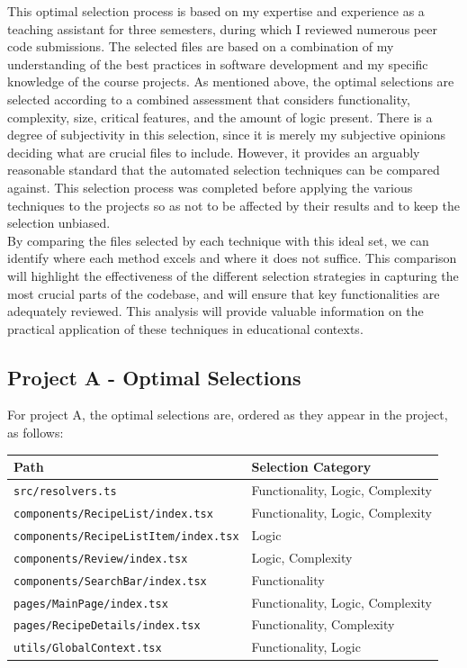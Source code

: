 This optimal selection process is based on my expertise and experience as a teaching assistant for three semesters, during which I reviewed numerous peer code submissions. The selected files are based on a combination of my understanding of the best practices in software development and my specific knowledge of the course projects. As mentioned above, the optimal selections are selected according to a combined assessment that considers functionality, complexity, size, critical features, and the amount of logic present. There is a degree of subjectivity in this selection, since it is merely my subjective opinions deciding what are crucial files to include. However, it provides an arguably reasonable standard that the automated selection techniques can be compared against. This selection process was completed before applying the various techniques to the projects so as not to be affected by their results and to keep the selection unbiased. \\

By comparing the files selected by each technique with this ideal set, we can identify where each method excels and where it does not suffice. This comparison will highlight the effectiveness of the different selection strategies in capturing the most crucial parts of the codebase, and will ensure that key functionalities are adequately reviewed. This analysis will provide valuable information on the practical application of these techniques in educational contexts.

\subsection{Project A - Optimal Selections}
For project A, the optimal selections are, ordered as they appear in the project, as follows: \\ 


\begin{center}
\begin{tabularx}{\textwidth}{>{\hsize=1.1\hsize}X >{\hsize=0.9\hsize}X}
    \toprule
    \textbf{Path} & \textbf{Selection Category} \\
    \midrule
    \texttt{src/resolvers.ts} & Functionality, Logic, Complexity  \\   
    \texttt{components/RecipeList/index.tsx} & Functionality, Logic, Complexity \\
    \texttt{components/RecipeListItem/index.tsx} & Logic \\   
    \texttt{components/Review/index.tsx} & Logic, Complexity \\
    \texttt{components/SearchBar/index.tsx} & Functionality \\
    \texttt{pages/MainPage/index.tsx} & Functionality,  Logic, Complexity \\
    \texttt{pages/RecipeDetails/index.tsx} & Functionality, Complexity \\
    \texttt{utils/GlobalContext.tsx} & Functionality, Logic\\
    \bottomrule
    
\end{tabularx}
\end{center}

